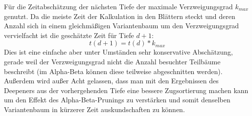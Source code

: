 Für die Zeitabschätzung der nächsten Tiefe der maximale Verzweigungsgrad $k_{max}$ genutzt. Da die meiste Zeit der Kalkulation in den Blättern steckt und deren Anzahl sich in einem gleichmäßigen Variantenbaum um den Verzweigungsgrad vervielfacht ist die geschätzte Zeit für Tiefe $d+1$:
\begin{equation*}
	t(d+1) = t(d) * k_{max}
\end{equation*}
Dies ist eine einfache aber unter Umständen sehr konservative Abschätzung, gerade weil der Verzweigungsgrad nicht die Anzahl besuchter Teilbäume beschreibt (im Alpha-Beta können diese teilweise abgeschnitten werden). Außerdem wird außer Acht gelassen, dass man mit den Ergebnissen des Deepeners aus der vorhergehenden Tiefe eine bessere Zugsortierung machen kann um den Effekt des Alpha-Beta-Prunings zu verstärken und somit denselben Variantenbaum in kürzerer Zeit auskundschaften zu können.